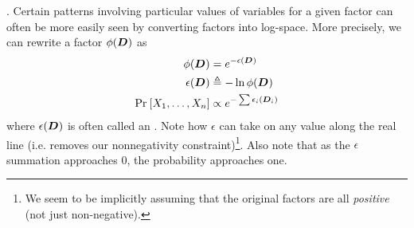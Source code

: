 \documentclass[11pt]{article}
\begin{document}
\myspace
\p {}. Certain patterns involving particular values of variables for a given factor can often be more easily seen by converting factors into log-space. More precisely, we can rewrite a factor $\phi(\matr D)$ as
\begin{align}
	\phi(\matr D) &= e^{- \epsilon(\matr D)} \\
	\epsilon(\matr D) &\triangleq -\ln \phi(\matr D) \\
	\Prob{X_1, \ldots, X_n} &\propto e^{- \sum \epsilon_i(\matr[i]{D}   )}
\end{align} 
where $\epsilon(\matr D)$ is often called an . Note how $\epsilon$ can take on any value along the real line (i.e. removes our nonnegativity constraint)\footnote{We seem to be implicitly assuming that the original factors are all \textit{positive} (not just non-negative).}. Also note that as the $\epsilon$ summation approaches 0, the probability approaches one. 
\end{document}
